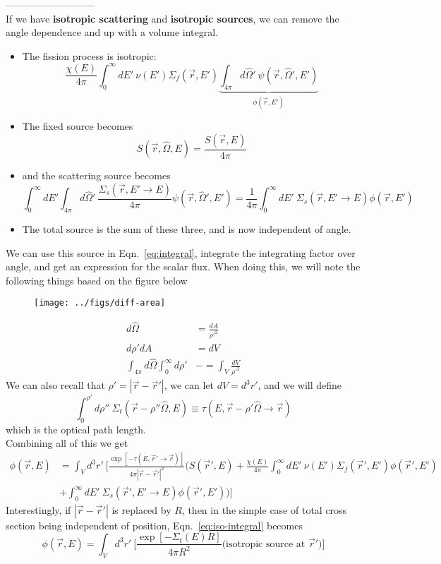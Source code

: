 \documentclass[12pt]{article}
\newcommand{\rvec}{\ensuremath{\vec{r}}}
\newcommand{\vOmega}{\ensuremath{\hat{\Omega}}}
\begin{document}
---------------------------\\
If we have \textbf{isotropic scattering} and \textbf{isotropic sources}, we can remove the angle dependence and up with a volume integral.
%
\begin{itemize}
\item The fission process is isotropic:
\[\frac{\chi(E)}{4\pi} \int_0^{\infty} dE' \: \nu(E') \Sigma_f(\rvec, E') \underbrace{\int_{4\pi} d\vOmega' \: \psi(\rvec, \vOmega', E')}_{\phi(\rvec,E')}\]
\item The fixed source becomes
\[S(\rvec, \vOmega, E) = \frac{S(\rvec, E)}{4 \pi}\]
\item and the scattering source becomes
\[\int_0^{\infty} dE' \int_{4\pi} d\vOmega' \: \frac{\Sigma_s(\rvec,E' \rightarrow E)}{4\pi} \psi(\rvec, \vOmega', E') = \frac{1}{4\pi}\int_0^{\infty} dE'\:\Sigma_s(\rvec,E' \rightarrow E) \phi(\rvec,E')\]
\item The total source is the sum of these three, and is now independent of angle.
\end{itemize}
%
We can use this source in Eqn.~\ref{eq:integral}, integrate the integrating factor over angle, and get an expression for the scalar flux. When doing this, we will note the following things based on the figure below
%
\begin{figure}[h]
\begin{center}
  \texttt{[image: ../figs/diff-area]}
\end{center}
\end{figure}
\begin{align*}
d\vOmega &= \frac{dA}{\rho'^2}\\
d\rho' dA &= dV \\
\int_{4\pi} d\vOmega \int_0^{\infty} d\rho' &-= \int_{V} \frac{dV}{\rho'^2}
\end{align*}
%
We can also recall that $\rho' = |\vec{r} - \vec{r}'|$, we can let $dV = d^3r'$, and we will define
\[\int_0^{\rho'} d\rho'' \: \Sigma_t(\rvec-\rho''\vOmega,E) \equiv \tau(E,\vec{r} - \rho' \vOmega \rightarrow \vec{r})
\]
which is the optical path length. \\
Combining all of this we get
\begin{align}
\phi(\rvec,E) &= \int_V d^3r' \: \biggl[\frac{\exp[-\tau(E,\vec{r}' \rightarrow \vec{r})]}{4\pi|\vec{r} - \vec{r}'|^2} \biggl(S(\vec{r}',E) + \frac{\chi(E)}{4\pi} \int_0^{\infty} dE' \: \nu(E') \Sigma_f(\rvec', E')\phi(\vec{r}', E') \nonumber \\
&+ \int_0^{\infty} dE'\:\Sigma_s(\rvec',E' \rightarrow E) \phi(\rvec',E') \biggr)  \biggr]
\label{eq:iso-integral}
\end{align}
%
Interestingly, if $|\vec{r} - \vec{r}'|$ is replaced by $R$, then in the simple case of total cross section being independent of position, Eqn.~\ref{eq:iso-integral} becomes
\[\phi(\rvec,E) = \int_V d^3r' \: \biggl[\frac{\exp[-\Sigma_t(E)R]}{4\pi R^2} \biggl( \text{isotropic source at }\vec{r}' \biggr)\biggr]\]
\end{document}
